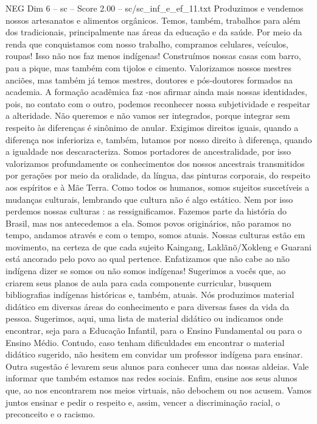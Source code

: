 \begin{textsample}{NEG Dim 6 – sc – Score 2.00 – sc/sc\_inf\_e\_ef\_11.txt}
Produzimos e vendemos nossos artesanatos e alimentos orgânicos.
Temos, também, trabalhos para além dos tradicionais, principalmente nas áreas da educação e da saúde.
Por meio da renda que conquistamos com nosso trabalho, compramos celulares, veículos, roupas!
Isso não nos faz menos indígenas!
Construímos nossas casas com barro, pau a pique, mas também com tijolos e cimento.
Valorizamos nossos mestres anciões, mas também já temos mestres, doutores e pós-doutores formados na academia.
A formação acadêmica faz -nos afirmar ainda mais nossas identidades, pois, no contato com o outro, podemos reconhecer nossa subjetividade e respeitar a alteridade.
Não queremos e não vamos ser integrados, porque integrar sem respeito às diferenças é sinônimo de anular.
Exigimos direitos iguais, quando a diferença nos inferioriza e, também, lutamos por nosso direito à diferença, quando a igualdade nos descaracteriza.
Somos portadores de ancestralidade, por isso valorizamos profundamente os conhecimentos dos nossos ancestrais transmitidos por gerações por meio da oralidade, da língua, das pinturas corporais, do respeito aos espíritos e à Mãe Terra.
Como todos os humanos, somos sujeitos suscetíveis a mudanças culturais, lembrando que cultura não é algo estático.
Nem por isso perdemos nossas culturas : as ressignificamos.
Fazemos parte da história do Brasil, mas nos antecedemos a ela.
Somos povos originários, não paramos no tempo, andamos através e com o tempo, somos atuais.
Nossas culturas estão em movimento, na certeza de que cada sujeito Kaingang, Laklãnõ/Xokleng e Guarani está ancorado pelo povo ao qual pertence.
Enfatizamos que não cabe ao não indígena dizer se somos ou não somos indígenas!
Sugerimos a vocês que, ao criarem seus planos de aula para cada componente curricular, busquem bibliografias indígenas históricas e, também, atuais.
Nós produzimos material didático em diversas áreas do conhecimento e para diversas fases da vida da pessoa.
Sugerimos, aqui, uma lista de material didático ou indicamos onde encontrar, seja para a Educação Infantil, para o Ensino Fundamental ou para o Ensino Médio.
Contudo, caso tenham dificuldades em encontrar o material didático sugerido, não hesitem em convidar um professor indígena para ensinar.
Outra sugestão é levarem seus alunos para conhecer uma das nossas aldeias.
Vale informar que também estamos nas redes sociais.
Enfim, ensine aos seus alunos que, ao nos encontrarem nos meios virtuais, não debochem ou nos acusem.
Vamos juntos ensinar e pedir o respeito e, assim, vencer a discriminação racial, o preconceito e o racismo.

\end{textsample}
